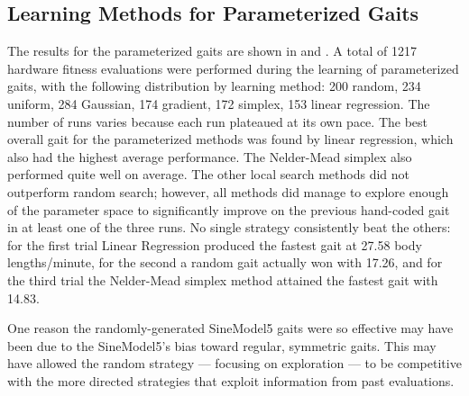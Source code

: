 


\subsection{Learning Methods for Parameterized Gaits}


The results for the parameterized gaits are shown in
 and .  A total of 1217 hardware
fitness evaluations were performed during the learning of
parameterized gaits, with the following distribution by learning
method: 200 random, 234 uniform, 284 Gaussian, 174 gradient, 172
simplex, 153 linear regression.  The number of runs varies because
each run plateaued at its own pace. The best overall gait for
the parameterized methods was found by linear regression, which also
had the highest average performance. The Nelder-Mead simplex also
performed quite well on average.  The other local search methods did not
outperform random search; however, all methods did manage to explore
enough of the parameter space to significantly improve on the previous
hand-coded gait in at least one of the three runs.  No single strategy
consistently beat the others: for the first trial Linear Regression
produced the fastest gait at 27.58 body lengths/minute, for the second
a random gait actually won with 17.26, and for the
third trial the Nelder-Mead simplex method attained the fastest gait
with 14.83.

One reason the randomly-generated SineModel5 gaits were so effective
may have been due to the SineModel5's bias toward regular, symmetric
gaits.  This may have allowed the random strategy --- focusing on
exploration --- to be competitive with the more directed strategies
that exploit information from past evaluations.



% 
% 
% 


